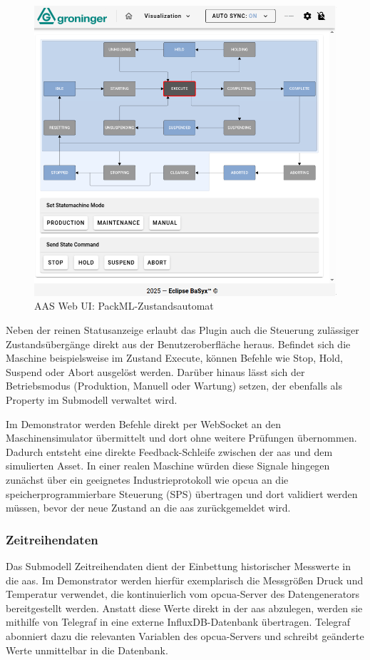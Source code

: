 \begin{figure}[htbp]
    \centering 
    \includegraphics[width=1\textwidth]{Bilder/Ergebnisse/DynamischeDaten/Kontrollkomponente/Visualisierung.png} 
    \caption{AAS Web UI: PackML-Zustandsautomat} 
    \label{fig:PackMLZustandsautomat} 
\end{figure}

Neben der reinen Statusanzeige erlaubt das Plugin auch die Steuerung zulässiger Zustandsübergänge direkt aus der Benutzeroberfläche heraus.
Befindet sich die Maschine beispielsweise im Zustand Execute, können Befehle wie Stop, Hold, Suspend oder Abort ausgelöst werden.
Darüber hinaus lässt sich der Betriebsmodus (Produktion, Manuell oder Wartung) setzen, der ebenfalls als Property im Submodell verwaltet wird.

Im Demonstrator werden Befehle direkt per WebSocket an den Maschinensimulator übermittelt und dort ohne weitere Prüfungen übernommen. 
Dadurch entsteht eine direkte Feedback-Schleife zwischen der \acs{aas} und dem simulierten Asset.
In einer realen Maschine würden diese Signale hingegen zunächst über ein geeignetes Industrieprotokoll wie \acs{opcua} an die speicherprogrammierbare Steuerung (SPS) übertragen und dort validiert werden müssen, bevor der neue Zustand an die \acs{aas} zurückgemeldet wird.

\subsubsection*{Zeitreihendaten}
Das Submodell Zeitreihendaten dient der Einbettung historischer Messwerte in die \acs{aas}. 
Im Demonstrator werden hierfür exemplarisch die Messgrößen Druck und Temperatur verwendet, die kontinuierlich vom \acs{opcua}-Server des Datengenerators bereitgestellt werden. 
Anstatt diese Werte direkt in der \acs{aas} abzulegen, werden sie mithilfe von Telegraf in eine externe InfluxDB-Datenbank übertragen. 
Telegraf abonniert dazu die relevanten Variablen des \acs{opcua}-Servers und schreibt geänderte Werte unmittelbar in die Datenbank.

